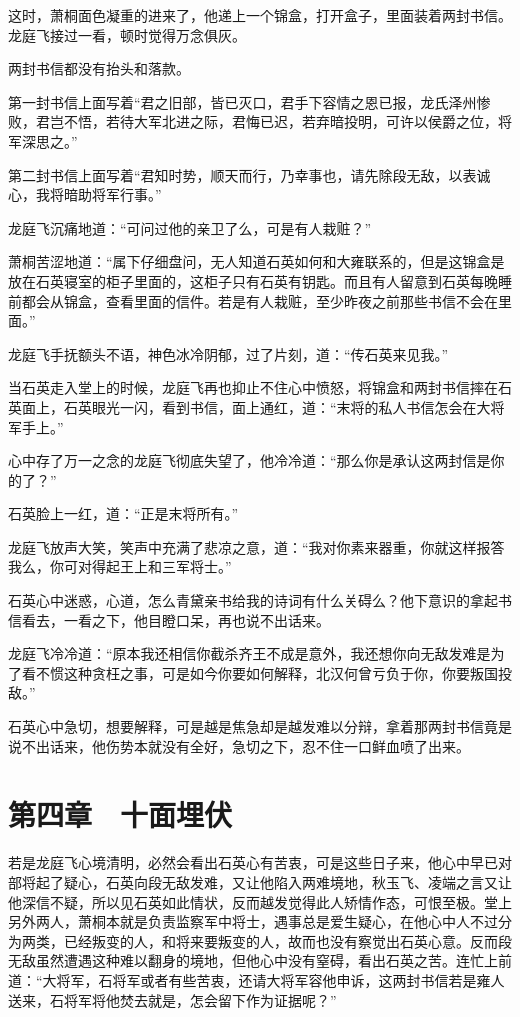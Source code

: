 这时，萧桐面色凝重的进来了，他递上一个锦盒，打开盒子，里面装着两封书信。龙庭飞接过一看，顿时觉得万念俱灰。

两封书信都没有抬头和落款。

第一封书信上面写着“君之旧部，皆已灭口，君手下容情之恩已报，龙氏泽州惨败，君岂不悟，若待大军北进之际，君悔已迟，若弃暗投明，可许以侯爵之位，将军深思之。”

第二封书信上面写着“君知时势，顺天而行，乃幸事也，请先除段无敌，以表诚心，我将暗助将军行事。”

龙庭飞沉痛地道：“可问过他的亲卫了么，可是有人栽赃？”

萧桐苦涩地道：“属下仔细盘问，无人知道石英如何和大雍联系的，但是这锦盒是放在石英寝室的柜子里面的，这柜子只有石英有钥匙。而且有人留意到石英每晚睡前都会从锦盒，查看里面的信件。若是有人栽赃，至少昨夜之前那些书信不会在里面。”

龙庭飞手抚额头不语，神色冰冷阴郁，过了片刻，道：“传石英来见我。”

当石英走入堂上的时候，龙庭飞再也抑止不住心中愤怒，将锦盒和两封书信摔在石英面上，石英眼光一闪，看到书信，面上通红，道：“末将的私人书信怎会在大将军手上。”

心中存了万一之念的龙庭飞彻底失望了，他冷冷道：“那么你是承认这两封信是你的了？”

石英脸上一红，道：“正是末将所有。”

龙庭飞放声大笑，笑声中充满了悲凉之意，道：“我对你素来器重，你就这样报答我么，你可对得起王上和三军将士。”

石英心中迷惑，心道，怎么青黛亲书给我的诗词有什么关碍么？他下意识的拿起书信看去，一看之下，他目瞪口呆，再也说不出话来。

龙庭飞冷冷道：“原本我还相信你截杀齐王不成是意外，我还想你向无敌发难是为了看不惯这种贪枉之事，可是如今你要如何解释，北汉何曾亏负于你，你要叛国投敌。”

石英心中急切，想要解释，可是越是焦急却是越发难以分辩，拿着那两封书信竟是说不出话来，他伤势本就没有全好，急切之下，忍不住一口鲜血喷了出来。

\chapter{第四章　十面埋伏}

若是龙庭飞心境清明，必然会看出石英心有苦衷，可是这些日子来，他心中早已对部将起了疑心，石英向段无敌发难，又让他陷入两难境地，秋玉飞、凌端之言又让他深信不疑，所以见石英如此情状，反而越发觉得此人矫情作态，可恨至极。堂上另外两人，萧桐本就是负责监察军中将士，遇事总是爱生疑心，在他心中人不过分为两类，已经叛变的人，和将来要叛变的人，故而也没有察觉出石英心意。反而段无敌虽然遭遇这种难以翻身的境地，但他心中没有窒碍，看出石英之苦。连忙上前道：“大将军，石将军或者有些苦衷，还请大将军容他申诉，这两封书信若是雍人送来，石将军将他焚去就是，怎会留下作为证据呢？”

